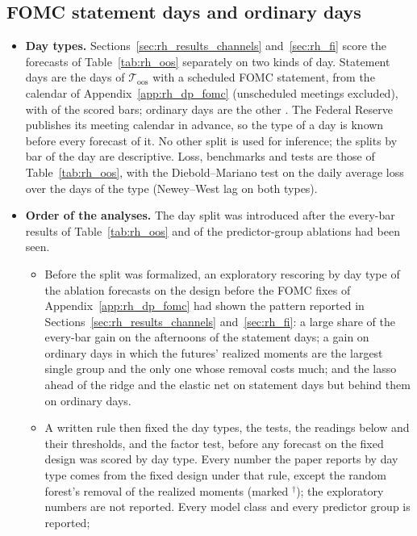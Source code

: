 \subsection{FOMC statement days and ordinary days}
\label{app:rh_channels}
\begin{itemize}
\item \textbf{Day types.} Sections~\ref{sec:rh_results_channels} and~\ref{sec:rh_fi} score the forecasts of
  Table~\ref{tab:rh_oos} separately on two kinds of day. Statement days are the \rhchNEventDays{} days of
  $\mathcal T_{\mathrm{oos}}$ with a scheduled FOMC statement, from the calendar of Appendix~\ref{app:rh_dp_fomc}
  (unscheduled meetings excluded), with \rhchNEventBars{} of the \rhchNBars{} scored bars; ordinary days are the other
  \rhchNOrdDays. The Federal Reserve publishes its meeting calendar in advance, so the type of a day is known before
  every forecast of it. No other split is used for inference; the splits by bar of the day are descriptive. Loss,
  benchmarks and tests are those of Table~\ref{tab:rh_oos}, with the Diebold--Mariano test on the daily average loss
  over the days of the type (Newey--West lag \rhchHacLag{} on both types).
\item \textbf{Order of the analyses.} The day split was introduced after the every-bar results of
  Table~\ref{tab:rh_oos} and of the predictor-group ablations had been seen.
  \begin{itemize}
  \item Before the split was formalized, an exploratory rescoring by day type of the ablation forecasts on the design
    before the FOMC fixes of Appendix~\ref{app:rh_dp_fomc} had shown the pattern reported in
    Sections~\ref{sec:rh_results_channels} and~\ref{sec:rh_fi}: a large share of the every-bar gain on the afternoons
    of the statement days; a gain on ordinary days in which the futures' realized moments are the largest single
    group and the only one whose removal costs much; and the lasso ahead of the ridge and the elastic net on statement
    days but behind them on ordinary days.
  \item A written rule then fixed the day types, the tests, the readings below and their thresholds, and the factor
    test, before any forecast on the fixed design was scored by day type. Every number the paper reports by day type
    comes from the fixed design under that rule, except the random forest's removal of the realized moments (marked
    $^{\dagger}$); the exploratory numbers are not reported. Every model class and every predictor group is reported;

\end{itemize}
\end{itemize}
